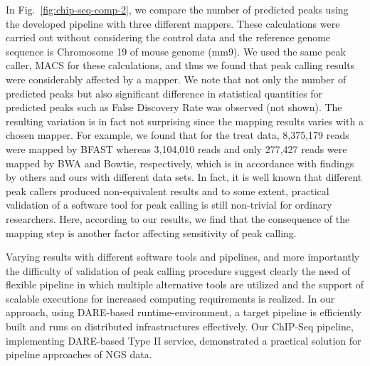 \documentclass{cpeauth}
\begin{document}
In Fig.~\ref{fig:chip-seq-comp-2}, we compare the number of predicted peaks using the developed pipeline with three different mappers.  These calculations were carried out without considering the control data and the reference genome sequence is Chromosome 19 of mouse genome (mm9).  We used the same peak caller, MACS for these calculations, and thus we found that peak calling results were considerably affected by a mapper.  We note that not only the number of predicted peaks but also significant difference in statistical quantities for predicted peaks such as False Discovery Rate was observed (not shown).  The resulting variation is in fact not surprising since the mapping results varies with a chosen mapper.   For example, we found that for the treat data, 8,375,179 reads were mapped by BFAST whereas 3,104,010 reads and only 277,427 reads were mapped by BWA and Bowtie, respectively, which is in accordance with findings by others and ours with different data sets\cite{bfast2009,mapping-survey}.  In fact, it is well known that different peak callers produced non-equivalent results and to some extent, practical validation of a software tool for peak calling is still non-trivial for ordinary researchers\cite{wilbanks, laajala}.  Here, according to our results, we find that the consequence of the mapping step is another factor affecting sensitivity of peak calling.

Varying results with different software tools and pipelines, and more importantly the difficulty of validation of peak calling procedure suggest clearly the need of flexible pipeline in which multiple alternative tools are utilized and the support of scalable executions for increased computing requirements is realized.  In our approach, using DARE-based runtime-environment, a target pipeline is efficiently built and runs on distributed infrastructures effectively.  
Our ChIP-Seq pipeline, implementing DARE-based Type II service, demonstrated a practical solution for pipeline approaches of NGS data. 
\end{document}
